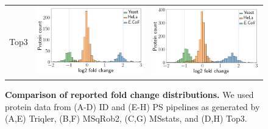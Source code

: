 \documentclass[11pt]{article}
\begin{document}
\begin{figure}[hbt]
\begin{tabular}{>{\centering\arraybackslash} m{3cm} V V}
        Top3 & \vspace{-0.9cm}\includegraphics[trim={0 0 0 10}, clip, width=\linewidth]{../../result/report_plots_pipeline/histogram_ID_top3.png} &
        \vspace{-1.1cm}\includegraphics[trim={0 0 0 15}, clip, width=\linewidth]{../../result/report_plots_pipeline/histogram_PS_top3.png} 
    \end{tabular}

    \caption{{\bf Comparison of reported fold change distributions.} We used protein data from (A-D) ID and (E-H) PS pipelines as generated by 
    (A,E) Triqler, (B,F) MSqRob2, (C,G) MSstats, and (D,H) Top3. \label{fig:fc_histogram_supplement}}
\end{figure}
\end{document}
